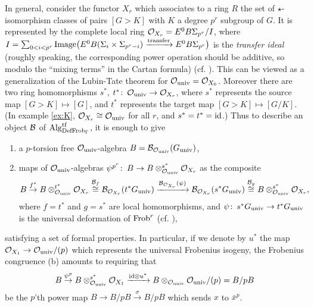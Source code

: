\documentclass{gtpart}
\theoremstyle{definition}
\theoremstyle{remark}
\def\co{\colon\thinspace}
\newcommand{\Alg}{{\rm Alg}}
\newcommand{\Frob}{{\rm Frob}}
\newcommand{\CO}{{\cal O}}
\newcommand{\DF}{{{\rm DefFrob}_\Gamma}}
\begin{document}
In general, consider the functor $X_r$ which associates to a ring $R$ the set 
of $\star$-isomorphism classes of pairs $[G > K]$ with $K$ a degree $p^r$ 
subgroup of $G$.  It is represented by the complete local ring $\CO_{X_r} = 
E^0 B\Sigma_{p^r}/I$, where $I = \sum_{0<i<p^r} 
{\rm Image}\big(E^0 B(\Sigma_i\times\Sigma_{p^r-i}) 
\xrightarrow{\rm transfer} E^0 B\Sigma_{p^r}\big)$ is the {\em transfer 
ideal} (roughly speaking, the corresponding power operation should be 
additive, so modulo the ``mixing terms'' in the Cartan formula) (cf. 
\cite[theorem 9.2]{strickland}).  This can be viewed as a generalization of 
the Lubin-Tate theorem for $\CO_{\rm univ} = \CO_{X_0}$.  Moreover there are 
two ring homomorphisms $s^*$, $t^*\co \CO_{\rm univ} \to \CO_{X_r}$, where 
$s^*$ represents the source map $[G > K] \mapsto [G]$, and $t^*$ represents 
the target map $[G > K] \mapsto [G/K]$.  (In example \ref{ex:K}, $\CO_{X_r} 
\cong \CO_{\rm univ}$ for all $r$, and $s^* = t^* = {\rm id}$.)  Thus to 
describe an object ${\cal B}$ of $\Alg_\DF^{\rm tf}$, it is enough to give 
\begin{enumerate}
 \item a $p$-torsion free $\CO_{\rm univ}$-algebra 
 $B = {\cal B}_{\CO_{\rm univ}}(G_{\rm univ})$, 
 \item maps of $\CO_{\rm univ}$-algebras 
 $\psi^{p^r}\co B \to B \otimes_{\CO_{\rm univ}}^{s^*} \CO_{X_r}$ as the 
 composite 
 \[
  B \stackrel{f^*}{\to} B \otimes_{\CO_{\rm univ}}^{t^*} \CO_{X_r} 
  \stackrel{{\cal B}_f}{\cong} {\cal B}_{\CO_{X_r}} (t^*G_{\rm univ}) 
  \xrightarrow{{\cal B}_{\CO_{X_r}} (\psi)} 
  {\cal B}_{\CO_{X_r}} (s^*G_{\rm univ}) 
  \stackrel{{\cal B}_g}{\cong} B \otimes_{\CO_{\rm univ}}^{s^*} \CO_{X_r}, 
 \]
 where $f = t^*$ and $g = s^*$ are local homomorphisms, and 
 $\psi\co s^*G_{\rm univ} \to t^*G_{\rm univ}$ is the universal deformation of 
 $\Frob^r$ (cf. \cite[section 13]{strick}), 
\end{enumerate}
satisfying a set of formal properties.  In particular, if we denote by $u^*$ 
the map $\CO_{X_1} \to \CO_{\rm univ}/(p)$ which represents the universal 
Frobenius isogeny, the Frobenius congruence (b) amounts to requiring that 
\[
 B \stackrel{\psi^p}{\to} B \otimes_{\CO_{\rm univ}}^{s^*} \CO_{X_1} 
 \xrightarrow{{\rm id} \otimes u^*} 
 B \otimes_{\CO_{\rm univ}} \CO_{\rm univ}/(p) = B/pB 
\]
be the $p$'th power map $B \to B/pB \stackrel{\sigma}{\to} B/pB$ which sends 
$x$ to $\bar{x}^p$.  
\end{document}
